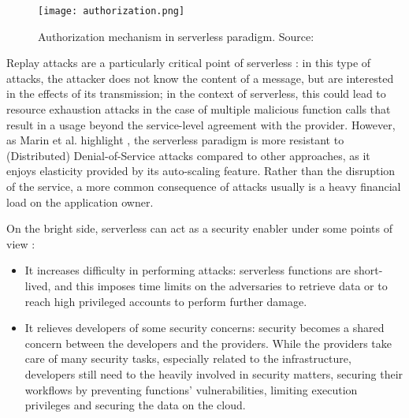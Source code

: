 \documentclass[
	a4paper, %
	12pt,
	twoside, %
]{LTJournalArticle}
\begin{document}
\begin{figure*}[!htb]
	\texttt{[image: authorization.png]}
	\caption{Authorization mechanism in serverless paradigm. Source: \cite{castro_rise_2019}}
	\label{fig:authorization}
\end{figure*}

Replay attacks are a particularly critical point of serverless \cite{shafiei_serverless_2022}: in this type of attacks, the attacker does not know the content of a message, but are interested in the effects of its transmission; in the context of serverless, this could lead to resource exhaustion attacks in the case of multiple malicious function calls that result in a usage beyond the service-level agreement with the provider. However, as Marin et al. highlight \cite{marin_serverless_2022}, the serverless paradigm is more resistant to (Distributed) Denial-of-Service attacks compared to other approaches, as it enjoys elasticity provided by its auto-scaling feature. Rather than the disruption of the service, a more common consequence of attacks usually is a heavy financial load on the application owner. 

On the bright side, serverless can act as a security enabler under some points of view \cite{marin_serverless_2022}:

\begin{itemize}
	\item It increases difficulty in performing attacks: serverless functions are short-lived, and this imposes time limits on the adversaries to retrieve data or to reach high privileged accounts to perform further damage.
	\item It relieves developers of some security concerns: security becomes a shared concern between the developers and the providers. While the providers take care of many security tasks, especially related to the infrastructure, developers still need to the heavily involved in security matters, securing their workflows by preventing functions' vulnerabilities, limiting execution privileges and securing the data on the cloud. 
\end{itemize}
\end{document}
